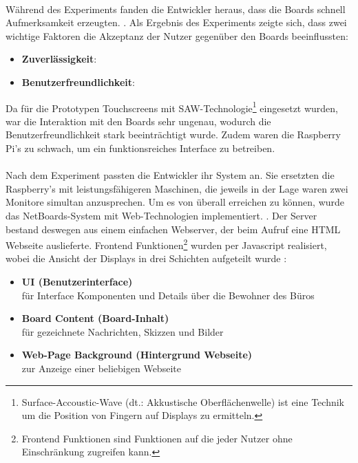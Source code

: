 \\
Während des Experiments fanden die Entwickler heraus, dass die Boards schnell Aufmerksamkeit erzeugten. .
Als Ergebnis des Experiments zeigte sich, dass zwei wichtige Faktoren die Akzeptanz der Nutzer gegenüber den Boards beeinflussten:
\begin{itemize}
  \item \textbf{Zuverlässigkeit}: 
  \item \textbf{Benutzerfreundlichkeit}: 
\end{itemize}
Da für die Prototypen Touchscreens mit SAW-Technologie\footnote{Surface-Accoustic-Wave (dt.: Akkustische Oberflächenwelle) ist eine Technik um die Position von Fingern auf Displays zu ermitteln.} eingesetzt wurden, war die Interaktion mit den Boards sehr ungenau, wodurch die Benutzerfreundlichkeit stark beeinträchtigt wurde.
Zudem waren die Raspberry Pi's zu schwach, um ein funktionsreiches Interface zu betreiben.
\\
\\
Nach dem Experiment passten die Entwickler ihr System an.
Sie ersetzten die Raspberry's mit leistungsfähigeren Maschinen, die jeweils in der Lage waren zwei Monitore simultan anzusprechen.
Um es von überall erreichen zu können, wurde das NetBoards-System mit Web-Technologien implementiert. .
Der Server bestand deswegen aus einem einfachen Webserver, der beim Aufruf eine HTML Webseite auslieferte. Frontend Funktionen\footnote{Frontend Funktionen sind Funktionen auf die jeder Nutzer ohne Einschränkung zugreifen kann.} wurden per Javascript realisiert, wobei die Ansicht der Displays in drei Schichten aufgeteilt wurde \cite{wood:2014}:
\begin{itemize}
  \item \textbf{UI (Benutzerinterface)}\\
    für Interface Komponenten und Details über die Bewohner des Büros
  \item \textbf{Board Content (Board-Inhalt)}\\
    für gezeichnete Nachrichten, Skizzen und Bilder
  \item \textbf{Web-Page Background (Hintergrund Webseite)}\\
    zur Anzeige einer beliebigen Webseite
\end{itemize}
